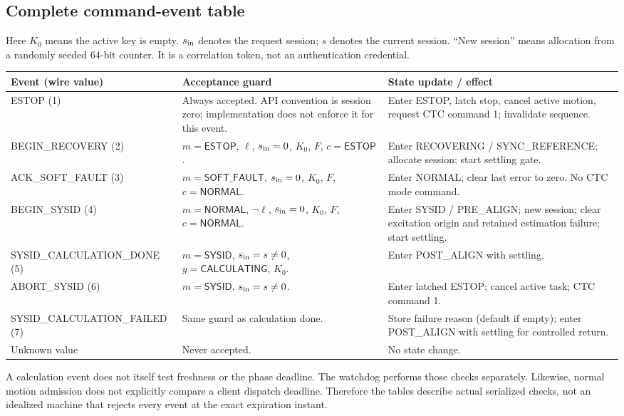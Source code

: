 \documentclass[11pt,a4paper]{report}
\newcommand{\N}{\mathsf{NORMAL}}
\newcommand{\E}{\mathsf{ESTOP}}
\newcommand{\Y}{\mathsf{SYSID}}
\newcommand{\SF}{\mathsf{SOFT\_FAULT}}
\begin{document}
\subsection{Complete command-event table}
Here $K_0$ means the active key is empty. $s_{\rm in}$ denotes the request session; $s$ denotes the current session. ``New session'' means allocation from a randomly seeded 64-bit counter. It is a correlation token, not an authentication credential.
\begin{longtable}{L{.22\linewidth}L{.37\linewidth}L{.34\linewidth}}
\toprule Event (wire value) & Acceptance guard & State update / effect \\\midrule\endhead
ESTOP (1) & Always accepted. API convention is session zero; implementation does not enforce it for this event. & Enter ESTOP, latch stop, cancel active motion, request CTC command 1; invalidate sequence. \\
BEGIN\_RECOVERY (2) & $m=\E$, $\ell$, $s_{\rm in}=0$, $K_0$, $F$, $c=\E$. & Enter RECOVERING / SYNC\_REFERENCE; allocate session; start settling gate. \\
ACK\_SOFT\_FAULT (3) & $m=\SF$, $s_{\rm in}=0$, $K_0$, $F$, $c=\N$. & Enter NORMAL; clear last error to zero. No CTC mode command. \\
BEGIN\_SYSID (4) & $m=\N$, $\neg\ell$, $s_{\rm in}=0$, $K_0$, $F$, $c=\N$. & Enter SYSID / PRE\_ALIGN; new session; clear excitation origin and retained estimation failure; start settling. \\
SYSID\_CALCULATION\_DONE (5) & $m=\Y$, $s_{\rm in}=s\ne0$, $y=\mathsf{CALCULATING}$, $K_0$. & Enter POST\_ALIGN with settling. \\
ABORT\_SYSID (6) & $m=\Y$, $s_{\rm in}=s\ne0$. & Enter latched ESTOP; cancel active task; CTC command 1. \\
SYSID\_CALCULATION\_FAILED (7) & Same guard as calculation done. & Store failure reason (default if empty); enter POST\_ALIGN with settling for controlled return. \\
Unknown value & Never accepted. & No state change. \\
\bottomrule
\end{longtable}
A calculation event does not itself test freshness or the phase deadline. The watchdog performs those checks separately. Likewise, normal motion admission does not explicitly compare a client dispatch deadline. Therefore the tables describe actual serialized checks, not an idealized machine that rejects every event at the exact expiration instant.
\end{document}
